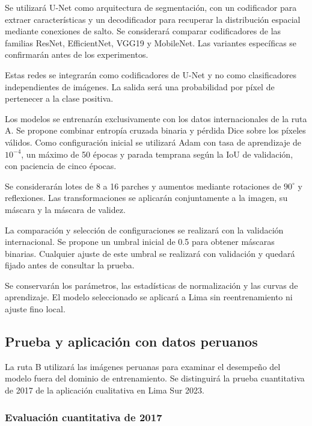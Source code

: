 \documentclass[conference]{IEEEtran}
\begin{document}
Se utilizará U-Net como arquitectura de segmentación,
con un codificador para extraer características
y un decodificador para recuperar la distribución
espacial mediante conexiones de salto.
Se considerará comparar codificadores de
las familias ResNet, EfficientNet, VGG19
y MobileNet. Las variantes específicas
se confirmarán antes de los experimentos.

Estas redes se integrarán como codificadores
de U-Net y no como clasificadores independientes
de imágenes. La salida será una probabilidad
por píxel de pertenecer a la clase positiva.

Los modelos se entrenarán exclusivamente con
los datos internacionales de la ruta A.
Se propone combinar entropía cruzada binaria
y pérdida Dice sobre los píxeles válidos.
Como configuración inicial se utilizará
Adam con tasa de aprendizaje de $10^{-4}$,
un máximo de 50 épocas y parada temprana
según la IoU de validación, con paciencia
de cinco épocas.

Se considerarán lotes de 8 a 16 parches
y aumentos mediante rotaciones de $90^{\circ}$
y reflexiones. Las transformaciones se
aplicarán conjuntamente a la imagen,
su máscara y la máscara de validez.

La comparación y selección de configuraciones
se realizará con la validación internacional.
Se propone un umbral inicial de 0.5 para
obtener máscaras binarias. Cualquier ajuste
de este umbral se realizará con validación
y quedará fijado antes de consultar la prueba.

Se conservarán los parámetros, las estadísticas
de normalización y las curvas de aprendizaje.
El modelo seleccionado se aplicará a Lima
sin reentrenamiento ni ajuste fino local.

\subsection{Prueba y aplicación con datos peruanos}
\label{subsec:evaluacion}

La ruta B utilizará las imágenes peruanas para
examinar el desempeño del modelo fuera del
dominio de entrenamiento. Se distinguirá
la prueba cuantitativa de 2017 de la aplicación
cualitativa en Lima Sur 2023.

\subsubsection{Evaluación cuantitativa de 2017}
\end{document}
